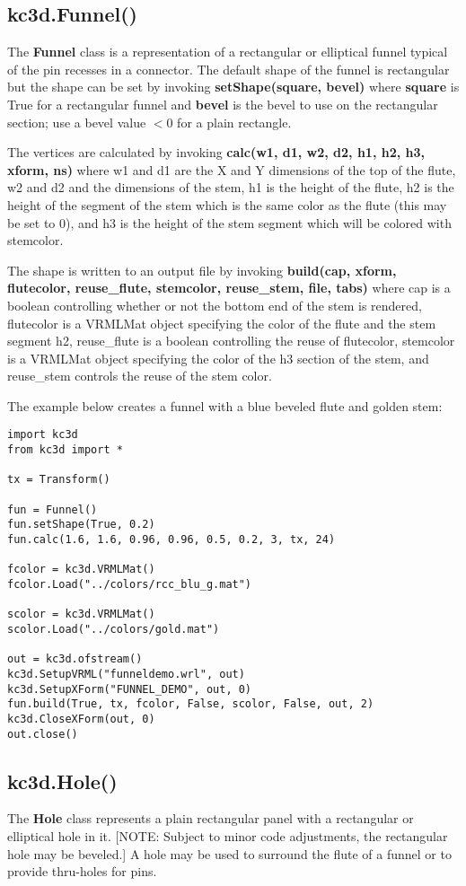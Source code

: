 \documentclass[a4paper, dvipdfm]{article}
\begin{document}
\subsection{kc3d.Funnel()}
The \textbf{Funnel} class is a representation of a rectangular or elliptical funnel typical
of the pin recesses in a connector. The default shape of the funnel is rectangular but the
shape can be set by invoking \textbf{setShape(square, bevel)} where \textbf{square} is True for
a rectangular funnel and \textbf{bevel} is the bevel to use on the rectangular section; use
a bevel value $<0$ for a plain rectangle.

The vertices are calculated by invoking \textbf{calc(w1, d1, w2, d2, h1, h2, h3, xform, ns)}
where w1 and d1 are the X and Y dimensions of the top of the flute, w2 and d2 and the
dimensions of the stem, h1 is the height of the flute, h2 is the height of the segment of
the stem which is the same color as the flute (this may be set to 0), and h3 is the
height of the stem segment which will be colored with stemcolor.

The shape is written to an output file by invoking \textbf{build(cap, xform, flutecolor,
reuse\_flute, stemcolor, reuse\_stem, file, tabs)} where cap is a boolean controlling
whether or not the bottom end of the stem is rendered, flutecolor is a VRMLMat object
specifying the color of the flute and the stem segment h2, reuse\_flute is a boolean
controlling the reuse of flutecolor, stemcolor is a VRMLMat object specifying the color
of the h3 section of the stem, and reuse\_stem controls the reuse of the stem color.

The example below creates a funnel with a blue beveled flute and golden stem:

\begin{verbatim}
import kc3d
from kc3d import *

tx = Transform()

fun = Funnel()
fun.setShape(True, 0.2)
fun.calc(1.6, 1.6, 0.96, 0.96, 0.5, 0.2, 3, tx, 24)

fcolor = kc3d.VRMLMat()
fcolor.Load("../colors/rcc_blu_g.mat")

scolor = kc3d.VRMLMat()
scolor.Load("../colors/gold.mat")

out = kc3d.ofstream()
kc3d.SetupVRML("funneldemo.wrl", out)
kc3d.SetupXForm("FUNNEL_DEMO", out, 0)
fun.build(True, tx, fcolor, False, scolor, False, out, 2)
kc3d.CloseXForm(out, 0)
out.close()
\end{verbatim}

\subsection{kc3d.Hole()}
The \textbf{Hole} class represents a plain rectangular panel with a rectangular or elliptical
hole in it. [NOTE: Subject to minor code adjustments, the rectangular hole may be beveled.]
A hole may be used to surround the flute of a funnel or to provide thru-holes for pins.
\end{document}
